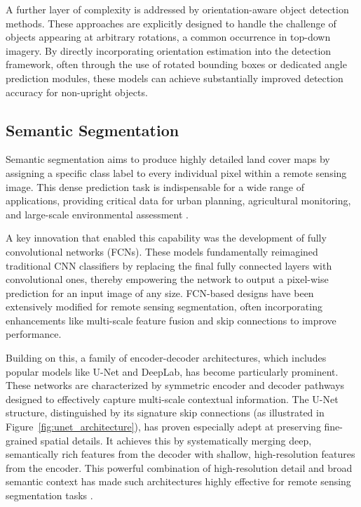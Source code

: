 \documentclass[12pt,a4paper]{article}
\begin{document}
A further layer of complexity is addressed by orientation-aware object detection methods. These approaches are explicitly designed to handle the challenge of objects appearing at arbitrary rotations, a common occurrence in top-down imagery. By directly incorporating orientation estimation into the detection framework, often through the use of rotated bounding boxes or dedicated angle prediction modules, these models can achieve substantially improved detection accuracy for non-upright objects.

\subsection{Semantic Segmentation}
Semantic segmentation aims to produce highly detailed land cover maps by assigning a specific class label to every individual pixel within a remote sensing image. This dense prediction task is indispensable for a wide range of applications, providing critical data for urban planning, agricultural monitoring, and large-scale environmental assessment \cite{maggiori2017end}.

A key innovation that enabled this capability was the development of fully convolutional networks (FCNs). These models fundamentally reimagined traditional CNN classifiers by replacing the final fully connected layers with convolutional ones, thereby empowering the network to output a pixel-wise prediction for an input image of any size. FCN-based designs have been extensively modified for remote sensing segmentation, often incorporating enhancements like multi-scale feature fusion and skip connections to improve performance.

Building on this, a family of encoder-decoder architectures, which includes popular models like U-Net and DeepLab, has become particularly prominent. These networks are characterized by symmetric encoder and decoder pathways designed to effectively capture multi-scale contextual information. The U-Net structure, distinguished by its signature skip connections (as illustrated in Figure~\ref{fig:unet_architecture}), has proven especially adept at preserving fine-grained spatial details. It achieves this by systematically merging deep, semantically rich features from the decoder with shallow, high-resolution features from the encoder. This powerful combination of high-resolution detail and broad semantic context has made such architectures highly effective for remote sensing segmentation tasks \cite{liu2019learning}.
\end{document}
